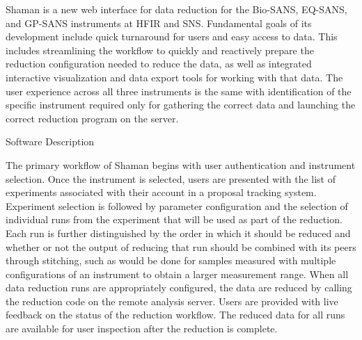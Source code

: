 Shaman is a new web interface for data reduction for the Bio-SANS, EQ-SANS, and GP-SANS instruments
at HFIR and SNS. Fundamental goals of its development include quick turnaround for users and easy
access to data. This includes streamlining the workflow to quickly and reactively prepare the
reduction configuration needed to reduce the data, as well as integrated interactive visualization
and data export tools for working with that data. The user experience across all three instruments
is the same with identification of the specific instrument required only for gathering the correct
data and launching the correct reduction program on the server. 

Software Description

The primary workflow of Shaman begins with user authentication and instrument selection. Once the
instrument is selected, users are presented with the list of experiments associated with their
account in a proposal tracking system. Experiment selection is followed by parameter configuration
and the selection of individual runs from the experiment that will be used as part of the reduction.
Each run is further distinguished by the order in which it should be reduced and whether or not the
output of reducing that run should be combined with its peers through stitching, such as would be
done for samples measured with multiple configurations of an instrument to obtain a larger
measurement range. When all data reduction runs are appropriately configured, the data are reduced
by calling the reduction code on the remote analysis server. Users are provided with live feedback
on the status of the reduction workflow. The reduced data for all runs are available for user
inspection after the reduction is complete. 

